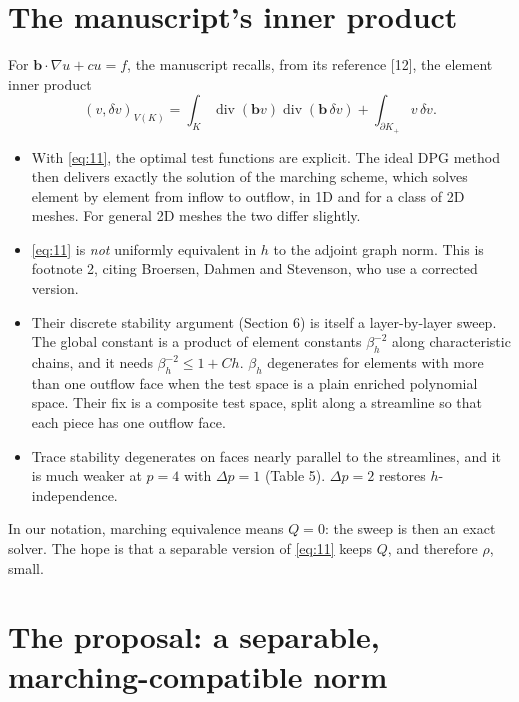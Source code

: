 \documentclass[11pt]{article}
\theoremstyle{remark}
\begin{document}
\section{The manuscript's inner product}

For $\mathbf b\cdot\nabla u+cu=f$, the manuscript recalls, from its reference [12], the element inner product
\begin{equation}\label{eq:11}
  (v,\delta v)_{V(K)} = \int_K \operatorname{div}(\mathbf b v)\operatorname{div}(\mathbf b\,\delta v) + \int_{\partial K_+} v\,\delta v .
\end{equation}
\begin{itemize}[nosep]
  \item With \eqref{eq:11}, the optimal test functions are explicit.  The ideal DPG method then delivers exactly the
        solution of the marching scheme, which solves element by element from inflow to outflow, in 1D and for a class of
        2D meshes.  For general 2D meshes the two differ slightly.
  \item \eqref{eq:11} is \emph{not} uniformly equivalent in $h$ to the adjoint graph norm.  This is footnote 2, citing
        Broersen, Dahmen and Stevenson, who use a corrected version.
  \item Their discrete stability argument (Section 6) is itself a layer-by-layer sweep.  The global constant is a
        product of element constants $\beta_h^{-2}$ along characteristic chains, and it needs $\beta_h^{-2}\le1+Ch$.
        $\beta_h$ degenerates for elements with more than one outflow face when the test space is a plain enriched
        polynomial space.  Their fix is a composite test space, split along a streamline so that each piece has one
        outflow face.
  \item Trace stability degenerates on faces nearly parallel to the streamlines, and it is much weaker at $p=4$ with
        $\Delta p=1$ (Table 5).  $\Delta p=2$ restores $h$-independence.
\end{itemize}
In our notation, marching equivalence means $Q=0$: the sweep is then an exact solver.  The hope is that a separable
version of \eqref{eq:11} keeps $Q$, and therefore $\rho$, small.

\section{The proposal: a separable, marching-compatible norm}
\end{document}
